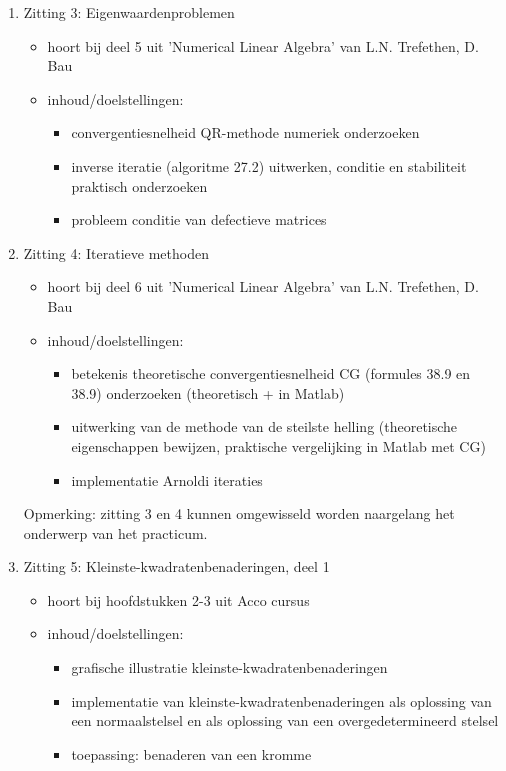 \begin{enumerate}
	\item Zitting 3: Eigenwaardenproblemen
	      \begin{itemize}
		      \item hoort bij deel 5 uit 'Numerical Linear Algebra' van L.N. Trefethen, D. Bau
		      \item inhoud/doelstellingen:
		            \begin{itemize}
			            \item convergentiesnelheid QR-methode numeriek onderzoeken
			            \item inverse iteratie (algoritme 27.2) uitwerken, conditie en stabiliteit praktisch onderzoeken
			            \item probleem conditie van defectieve matrices
		            \end{itemize}
	      \end{itemize}

	\item Zitting 4: Iteratieve methoden
	      \begin{itemize}
		      \item hoort bij deel 6 uit 'Numerical Linear Algebra' van L.N. Trefethen, D. Bau
		      \item inhoud/doelstellingen:
		            \begin{itemize}
			            \item betekenis theoretische convergentiesnelheid CG (formules 38.9 en 38.9) onderzoeken (theoretisch + in Matlab)
			            \item uitwerking van de methode van de steilste helling (theoretische eigenschappen bewijzen, praktische vergelijking in Matlab met CG)
			            \item implementatie Arnoldi iteraties
		            \end{itemize}
	      \end{itemize}
	      Opmerking: zitting 3 en 4 kunnen omgewisseld worden naargelang het onderwerp van het practicum.

	\item Zitting 5: Kleinste-kwadratenbenaderingen, deel 1
	      \begin{itemize}
		      \item hoort bij hoofdstukken 2-3 uit Acco cursus
		      \item inhoud/doelstellingen:
		            \begin{itemize}
			            \item grafische illustratie kleinste-kwadratenbenaderingen
			            \item implementatie van kleinste-kwadratenbenaderingen als oplossing van een normaalstelsel en als oplossing van een overgedetermineerd stelsel
			            \item toepassing: benaderen van een kromme
		            \end{itemize}
	      \end{itemize}


\end{enumerate}
